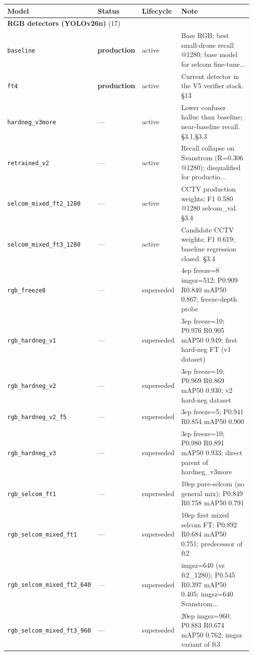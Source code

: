\documentclass[12pt,a4paper,oneside,openright]{book}
\renewcommand{\footnotesize}{\fontsize{11pt}{13pt}\selectfont}
\begin{document}
\footnotesize
\begin{longtable}{p{}llp{}}
\toprule
Model & Status & Lifecycle & Note \\
\midrule
\endhead
\multicolumn{4}{l}{\textbf{RGB detectors (YOLOv26n)} (17)} \\
\midrule
\texttt{baseline} & \textbf{production} & active & Base RGB; best small-drone recall @1280; base model for selcom fine-tune... \\
\texttt{ft4} & \textbf{production} & active & Current detector in the V5 verifier stack. §13 \\
\texttt{hardneg\_v3more} & --- & active & Lower confuser halluc than baseline; near-baseline recall. §3.1,§3.3 \\
\texttt{retrained\_v2} & --- & active & Recall collapse on Svanstrom (R=0.306 @1280); disqualified for productio... \\
\texttt{selcom\_mixed\_ft2\_1280} & --- & active & CCTV production weights; F1 0.580 @1280 selcom\_val. §3.4 \\
\texttt{selcom\_mixed\_ft3\_1280} & --- & active & Candidate CCTV weights; F1 0.619; baseline regression closed. §3.4 \\
\texttt{rgb\_freeze8} & --- & superseded & 4ep freeze=8 imgsz=512; P0.909 R0.840 mAP50 0.867; freeze-depth probe \\
\texttt{rgb\_hardneg\_v1} & --- & superseded & 3ep freeze=10; P0.976 R0.905 mAP50 0.949; first hard-neg FT (v1 dataset) \\
\texttt{rgb\_hardneg\_v2} & --- & superseded & 3ep freeze=10; P0.969 R0.869 mAP50 0.930; v2 hard-neg dataset \\
\texttt{rgb\_hardneg\_v2\_f5} & --- & superseded & 3ep freeze=5; P0.941 R0.854 mAP50 0.900 \\
\texttt{rgb\_hardneg\_v3} & --- & superseded & 3ep freeze=10; P0.980 R0.891 mAP50 0.933; direct parent of hardneg\_v3more \\
\texttt{rgb\_selcom\_ft1} & --- & superseded & 10ep pure-selcom (no general mix); P0.849 R0.758 mAP50 0.791 \\
\texttt{rgb\_selcom\_mixed\_ft1} & --- & superseded & 10ep first mixed selcom FT; P0.892 R0.684 mAP50 0.751; predecessor of ft2 \\
\texttt{rgb\_selcom\_mixed\_ft2\_640} & --- & superseded & imgsz=640 (vs ft2\_1280); P0.545 R0.397 mAP50 0.405; imgsz=640 Svanstrom... \\
\texttt{rgb\_selcom\_mixed\_ft3\_960} & --- & superseded & 20ep imgsz=960; P0.883 R0.674 mAP50 0.762; imgsz variant of ft3 \\

\end{longtable}
\end{document}
